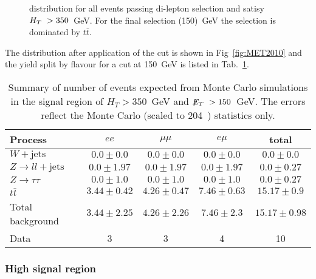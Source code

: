 \begin{figure}[hbtp]
  \hfill
  \caption{\MET distribution for all events passing di-lepton selection and satisy $H_T~> 350$~GeV. For the final \MET selection (150)~GeV the selection is dominated by $t\bar{t}$.}
\end{figure}

The \MET distribution after application of the \HT
cut is shown in Fig~\ref{fig:MET2010} and
the yield split by flavour for a cut at 150~GeV is listed in Tab.~\ref{tab:2010}.

\begin{table}[htb]
\begin{center}
\caption{\label{tab:2010}\protect Summary of number of events expected from Monte Carlo simulations in 
the signal region of $H_T> 350$~GeV and $\displaystyle{\not} E_T~> 150$~GeV. The errors reflect the Monte Carlo (scaled
    to 204~\pbi) statistics only.}
\begin{tabular}{l|ccc|c}
\hline
Process           & $ee$       & $\mu\mu$     & $e\mu$   & total   \\
\hline\hline
$W+\textrm{jets}$&$0.0 \pm 0.0$&$0.0 \pm 0.0$&$0.0 \pm 0.0$&$0.0 \pm 0.0$\\
$Z\rightarrow ll+\textrm{jets}$&$0.0 \pm 1.97$&$0.0 \pm 1.97$&$0.0 \pm 1.97$&$0.0 \pm 0.27$\\
$Z \rightarrow \tau\tau$&$0.0 \pm 1.0$&$0.0 \pm 1.0$&$0.0 \pm 1.0$&$0.0 \pm 0.27$\\
$t\bar{t}$&$3.44 \pm 0.42$&$4.26 \pm 0.47$&$7.46 \pm 0.63$&$15.17 \pm 0.9$\\
\hline
Total background&$3.44 \pm 2.25$&$4.26 \pm 2.26$&$7.46 \pm 2.3$&$15.17 \pm 0.98$\\
\hline
Data  & 3 & 3 & 4 & 10 \\
\hline\hline
\end{tabular}
\end{center}
\end{table}

\subsubsection{High \HT signal region}


